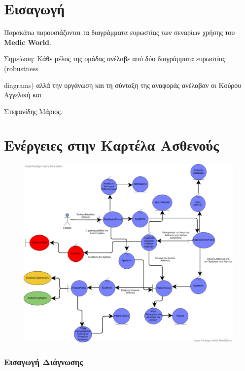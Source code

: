 \documentclass{article}
\begin{document}
\section{Εισαγωγή}

Παρακάτω παρουσιάζονται τα διαγράμματα ευρωστίας των σεναρίων χρήσης του \textbf{Medic World}. \vspace{0.2cm}

\underline{Σημείωση:} Κάθε μέλος της ομάδας ανέλαβε από δύο διαγράμματα ευρωστίας (robustness \par diagrams) αλλά την οργάνωση και τη σύνταξη της αναφοράς ανέλαβαν οι Κούρου Αγγελική και \par Στεφανίδης Μάριος.  


\section{Ενέργειες στην Καρτέλα Ασθενούς}

\vspace{0.2cm}

\begin{figure}[!htb]
        \centering
        \includegraphics[width=1\textwidth]{Patient Card.png}
\end{figure}

\newpage

\subsubsection{Εισαγωγή Διάγνωσης}
\end{document}
